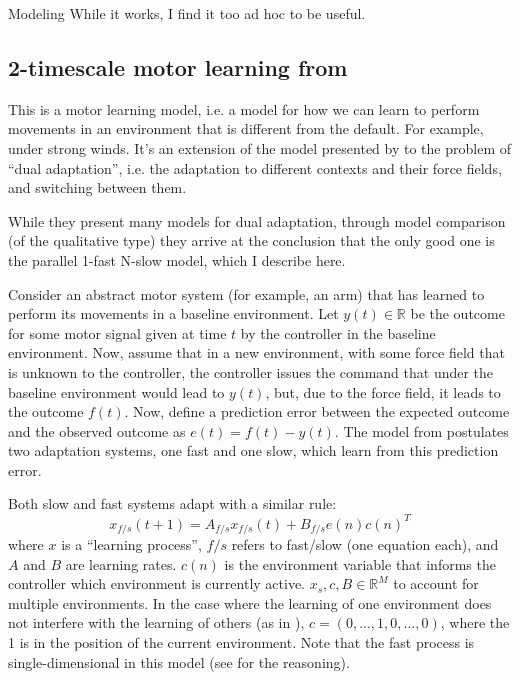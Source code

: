 \documentclass{report}
\begin{document}
\begin{chapter}{Modeling}
While it works, I find it too ad hoc to be useful.


\subsection{2-timescale motor learning from \cite{Lee_Dual_2009}}
\label{subsec:lee-dual}
This is a motor learning model, i.e. a model for how we can learn to perform
movements in an environment that is different from the default. For example,
under strong winds. It's an extension of the model presented by
\cite{Smith_Interacting_2006} to the problem of ``dual adaptation'', i.e. the
adaptation to different contexts and their force fields, and switching between
them.

While they present many models for dual adaptation, through model comparison (of
the qualitative type) they arrive at the conclusion that the only good one is
the parallel 1-fast N-slow model, which I describe here.

Consider an abstract motor system (for example, an arm) that has learned to
perform its movements in a baseline environment. Let $y(t) \in \mathbb{R}$ be
the outcome for some motor signal given at time $t$ by the controller in the
baseline environment. Now, assume that in a new environment, with some force
field that is unknown to the controller, the controller issues the command that
under the baseline environment would lead to $y(t)$, but, due to the force
field, it leads to the outcome $f(t)$. Now, define a prediction error between
the expected outcome and the observed outcome as $e(t) = f(t) - y(t)$. The model
from \cite{Lee_Dual_2009} postulates two adaptation systems, one fast and one
slow, which learn from this prediction error.

Both slow and fast systems adapt with a similar rule:
\[
x_{f/s}(t + 1) = A_{f/s}x_{f/s}(t) + B_{f/s}e(n)c(n)^T \label{eqn:lee-learn}
\]
where $x$ is a ``learning process'', $f/s$ refers to fast/slow (one equation
each), and $A$ and $B$ are learning rates. $c(n)$ is the environment variable
that informs the controller which environment is currently active.
$x_s,c, B \in \mathbb{R}^M$ to account for multiple environments. In the case
where the learning of one environment does not interfere with the learning of
others (as in \cite{Lee_Dual_2009}), $c = (0, ..., 1, 0, ..., 0)$, where the 1
is in the position of the current environment. Note that the fast process is
single-dimensional in this model (see \citep{Lee_Dual_2009} for the reasoning).


\end{chapter}
\end{document}
